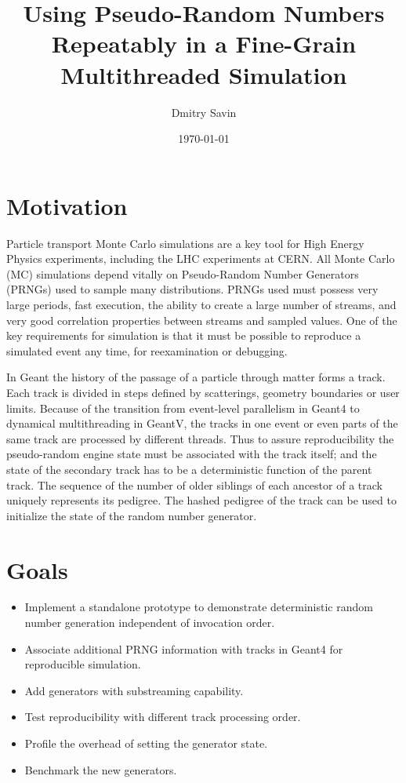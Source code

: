 \documentclass[a4paper, 12pt]{article} %
\title{Using Pseudo-Random Numbers Repeatably in a Fine-Grain Multithreaded Simulation}
\author{Dmitry Savin}
\date{\today}
\begin{document}
 \maketitle

 \section*{ Motivation }
  Particle transport Monte Carlo simulations are a key tool for High Energy Physics experiments, including the LHC experiments at CERN.
  All Monte Carlo (MC) simulations depend vitally on Pseudo-Random Number Generators (PRNGs) used to sample many distributions.
  PRNGs used must possess very large periods, fast execution, the ability to create a large number of streams, and very good correlation properties between streams and sampled values.
  One of the key requirements for simulation is that it must be possible to reproduce a simulated event any time, for reexamination or debugging.

  In Geant the history of the passage of a particle through matter forms a track.
  Each track is divided in steps defined by scatterings, geometry boundaries or user limits.
  Because of the transition from event-level parallelism in Geant4 to dynamical multithreading in GeantV, the tracks in one event or even parts of the same track are processed by different threads.
  Thus to assure reproducibility the pseudo-random engine state must be associated with the track itself;
  and the state of the secondary track has to be a deterministic function of the parent track.
  The sequence of the number of older siblings of each ancestor of a track uniquely represents its pedigree.
  The hashed pedigree of the track can be used to initialize the state of the random number generator.
  
 \section*{ Goals }
 
  \begin{itemize}
   \item Implement a standalone prototype to demonstrate deterministic random number generation independent of invocation order.
   \item Associate additional PRNG information with tracks in Geant4 for reproducible simulation.
   \item Add generators with substreaming capability.
   \item Test reproducibility with different track processing order.
   \item Profile the overhead of setting the generator state.
   \item Benchmark the new generators.
  \end{itemize}
  
\end{document}
